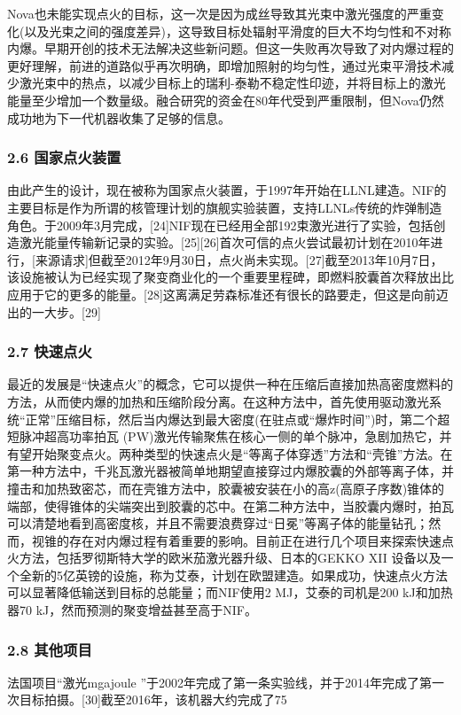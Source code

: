 Nova也未能实现点火的目标，这一次是因为成丝导致其光束中激光强度的严重变化(以及光束之间的强度差异)，这导致目标处辐射平滑度的巨大不均匀性和不对称内爆。早期开创的技术无法解决这些新问题。但这一失败再次导致了对内爆过程的更好理解，前进的道路似乎再次明确，即增加照射的均匀性，通过光束平滑技术减少激光束中的热点，以减少目标上的瑞利-泰勒不稳定性印迹，并将目标上的激光能量至少增加一个数量级。融合研究的资金在80年代受到严重限制，但Nova仍然成功地为下一代机器收集了足够的信息。
\subsubsection{2.6 国家点火装置}
由此产生的设计，现在被称为国家点火装置，于1997年开始在LLNL建造。NIF的主要目标是作为所谓的核管理计划的旗舰实验装置，支持LLNLs传统的炸弹制造角色。于2009年3月完成，[24]NIF现在已经用全部192束激光进行了实验，包括创造激光能量传输新记录的实验。[25][26]首次可信的点火尝试最初计划在2010年进行，[来源请求]但截至2012年9月30日，点火尚未实现。[27]截至2013年10月7日，该设施被认为已经实现了聚变商业化的一个重要里程碑，即燃料胶囊首次释放出比应用于它的更多的能量。[28]这离满足劳森标准还有很长的路要走，但这是向前迈出的一大步。[29]
\subsubsection{2.7 快速点火}
最近的发展是“快速点火”的概念，它可以提供一种在压缩后直接加热高密度燃料的方法，从而使内爆的加热和压缩阶段分离。在这种方法中，首先使用驱动激光系统“正常”压缩目标，然后当内爆达到最大密度(在驻点或“爆炸时间”)时，第二个超短脉冲超高功率拍瓦 (PW)激光传输聚焦在核心一侧的单个脉冲，急剧加热它，并有望开始聚变点火。两种类型的快速点火是“等离子体穿透”方法和“壳锥”方法。在第一种方法中，千兆瓦激光器被简单地期望直接穿过内爆胶囊的外部等离子体，并撞击和加热致密芯，而在壳锥方法中，胶囊被安装在小的高z(高原子序数)锥体的端部，使得锥体的尖端突出到胶囊的芯中。在第二种方法中，当胶囊内爆时，拍瓦可以清楚地看到高密度核，并且不需要浪费穿过“日冕”等离子体的能量钻孔；然而，视锥的存在对内爆过程有着重要的影响。目前正在进行几个项目来探索快速点火方法，包括罗彻斯特大学的欧米茄激光器升级、日本的GEKKO XII 设备以及一个全新的5亿英镑的设施，称为艾泰，计划在欧盟建造。如果成功，快速点火方法可以显著降低输送到目标的总能量；而NIF使用2 MJ，艾泰的司机是200 kJ和加热器70 kJ，然而预测的聚变增益甚至高于NIF。
\subsubsection{2.8 其他项目}
法国项目“激光mgajoule ”于2002年完成了第一条实验线，并于2014年完成了第一次目标拍摄。[30]截至2016年，该机器大约完成了75%

